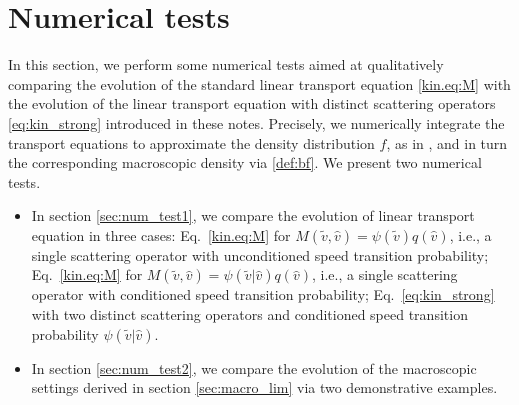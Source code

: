\documentclass[a4paper]{article}
\theoremstyle{Theorem}\newtheorem{proposition}{Proposition}[section]
\theoremstyle{Remark}\newtheorem{remark}{Remark}[section]
\theoremstyle{Theorem}\newtheorem{theorem}{Theorem}[section]
\newcommand{\hv}{\hat{v}}
\newcommand{\tv}{\tilde{v}}
\newcommand{\hf}{\hat{f}}
\begin{document}




\section{Numerical tests}\label{sec:num_tests}

In this section, we perform some numerical tests aimed at qualitatively comparing the evolution of the standard linear transport equation \eqref{kin.eq:M} with the evolution of the linear transport equation with distinct scattering operators \eqref{eq:kin_strong} introduced in these notes. Precisely, we numerically integrate the transport equations to approximate the density distribution $f$, as in \cite{loy2019JMB,conte2023SIAP,conte2022multi}, and in turn the corresponding macroscopic density via \eqref{def:bf}. We present two numerical tests.
\begin{itemize}
    \item[{\bf Test 1.}] In section \ref{sec:num_test1}, we compare the evolution of linear transport equation in three cases: Eq.~\eqref{kin.eq:M} for $M(\tv,\hv)=\psi(\tv)q(\hv)$, i.e., a single scattering operator with unconditioned speed transition probability; Eq.~\eqref{kin.eq:M} for $M(\tv,\hv)=\psi(\tv|\hv)q(\hv)$, i.e., a single scattering operator with conditioned speed transition probability; Eq.~\eqref{eq:kin_strong} with two distinct scattering operators and conditioned speed transition probability $\psi(\tv|\hv)$.
    \item[{\bf Test 2.}] In section \ref{sec:num_test2}, we compare the evolution of the macroscopic settings derived in section \ref{sec:macro_lim} via two demonstrative examples.
\end{itemize}
\end{document}
